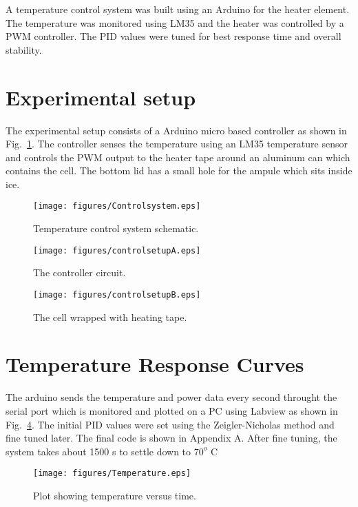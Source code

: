 A temperature control system was built using an Arduino for the heater element. The temperature was monitored using LM35 and the heater was controlled by a PWM controller. The PID values were tuned for best response time and overall stability. 

\section{Experimental setup}

The experimental setup consists of a Arduino micro based controller  as shown in Fig.~\ref{fig:controlschematic}. The controller senses the temperature using an LM35 temperature sensor and controls the PWM output to the heater tape around an aluminum can which contains the cell. The bottom lid has a small hole for the ampule which sits inside ice. 
\begin{figure}
	\centering
	\texttt{[image: figures/Controlsystem.eps]}
	\caption{\label{fig:controlschematic}Temperature control system schematic.}
\end{figure}

\begin{figure}
	\centering
	\texttt{[image: figures/controlsetupA.eps]}
	\caption{\label{fig:Trans111}The controller circuit.}
\end{figure}

\begin{figure}
	\centering
	\texttt{[image: figures/controlsetupB.eps]}
	\caption{\label{fig:Trans1111}The cell wrapped with heating tape.}
\end{figure}


\section{Temperature Response Curves}

The arduino sends the temperature and power data every second throught the serial port which is monitored and plotted on a PC using Labview as shown in Fig.~\ref{fig:Tempresp}. The initial PID values were set using the Zeigler-Nicholas method and fine tuned later. The final code is shown in Appendix A. After fine tuning, the system takes about 1500 s to settle down to $70^o$ C
\begin{figure}
	\centering
	\texttt{[image: figures/Temperature.eps]}
	\caption{\label{fig:Tempresp} Plot showing temperature versus time.}
\end{figure}

